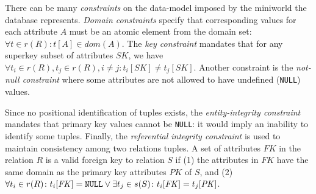 \documentclass [a4paper, 12pt, twocolumn]{article}
\newcommand{\m}    {\mathit}            %
\newcommand{\<}    {\langle}            %
\renewcommand{\>}  {\rangle}            %
\begin{document}
There can be many \emph{constraints} on the data-model imposed by the
miniworld the database represents. \emph{Domain constraints} specify that
corresponding values for each attribute $A$ must be an atomic element from
the domain set: $\forall t \in r(R) \colon t[A] \in \m{dom}(A)$. The
\emph{key constraint} mandates that for any superkey subset of attributes
$\m{SK}$, we have $\forall
t_i \in r(R), t_j \in r(R), i \not= j \colon t_i[\m{SK}] \not= t_j[\m{SK}]$.
Another constraint is the \emph{not-null constraint} where some attributes
are not allowed to have undefined (\verb/NULL/) values.\cite{elmasri}

Since no positional identification of tuples exists, the
\emph{entity-integrity constraint} mandates that primary key values cannot be
\verb/NULL/: it would imply an inability to identify some tuples. Finally,
the \emph{referential integrity constraint} is used to maintain consistency
among two relations tuples. A set of attributes $\m{FK}$ in the relation $R$
is a valid foreign key to relation $S$ if (1) the attributes in $\m{FK}$ have
the same domain as the primary key attributes $\m{PK}$ of $S$, and (2)
$\forall t_i \in r(R) \colon
t_i[\m{FK}] = \hbox{\verb/NULL/} \lor
\exists t_j \in s(S) \colon t_i[\m{FK}] = t_j[\m{PK}]$.
\end{document}
